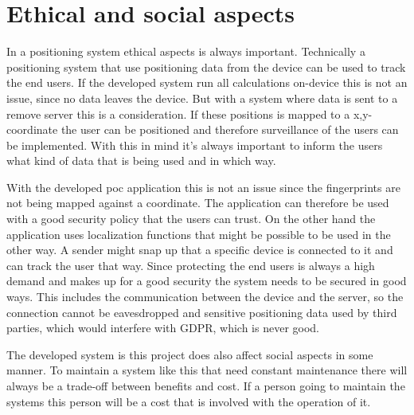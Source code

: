 





\section{Ethical and social aspects}\label{sec:discussionAspects}
In a positioning system ethical aspects is always important.
Technically a positioning system that use positioning data from the device can be used to track the end users.
If the developed system run all calculations on-device this is not an issue, since no data leaves the device.
But with a system where data is sent to a remove server this is a consideration.
If these positions is mapped to a x,y-coordinate the user can be positioned and therefore surveillance of the users can be implemented.
With this in mind it's always important to inform the users what kind of data that is being used and in which way.

\bigskip

With the developed \acrshort{poc} application this is not an issue since the fingerprints are not being mapped against a coordinate.
The application can therefore be used with a good security policy that the users can trust.
On the other hand the application uses localization functions that might be possible to be used in the other way.
A sender might snap up that a specific device is connected to it and can track the user that way.
Since protecting the end users is always a high demand and makes up for a good security the system needs to be secured in good ways.
This includes the communication between the device and the server, so the connection cannot be eavesdropped and sensitive positioning data used by third parties, which would interfere with GDPR, which is never good.

\bigskip

The developed system is this project does also affect social aspects in some manner.
To maintain a system like this that need constant maintenance there will always be a trade-off between benefits and cost.
If a person going to maintain the systems this person will be a cost that is involved with the operation of it.

